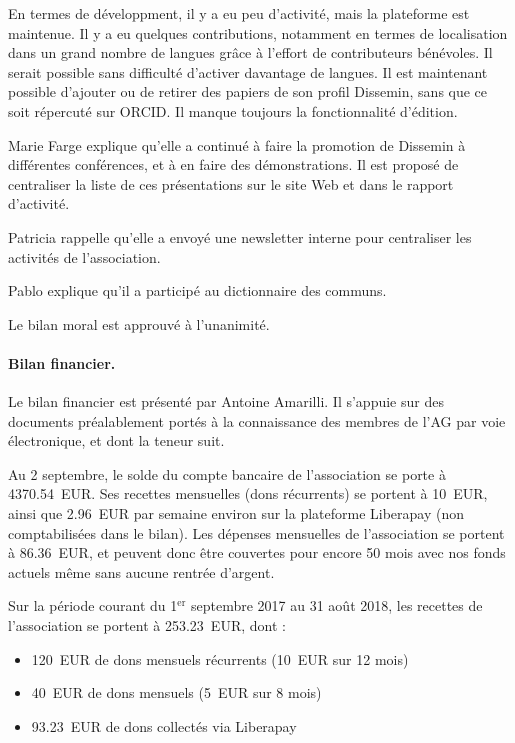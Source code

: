 \documentclass{scrartcl}
\begin{document}
En termes de développment, il y a eu peu d'activité, mais la plateforme est
maintenue. Il y a eu quelques contributions, notamment en termes de
localisation dans un grand nombre de langues grâce à l'effort de contributeurs
bénévoles. Il serait possible sans difficulté d'activer davantage de langues. Il
est maintenant possible d'ajouter ou de retirer des papiers de son profil
Dissemin, sans que ce soit répercuté sur ORCID. Il manque toujours la
fonctionnalité d'édition.

Marie Farge explique qu'elle a continué à faire la promotion de Dissemin à
différentes conférences, et à en faire des démonstrations. Il est proposé de
centraliser la liste de ces présentations sur le site Web et dans le rapport
d'activité.

Patricia rappelle qu'elle a envoyé une newsletter interne pour centraliser les
activités de l'association.

Pablo explique qu'il a participé au dictionnaire des communs.

Le bilan moral est approuvé à l'unanimité.

\paragraph{Bilan financier.} Le bilan financier est présenté par Antoine
Amarilli. Il s'appuie sur des documents préalablement portés à la connaissance des
membres de l'AG par voie électronique, et dont la teneur suit.

Au 2 septembre, le solde du compte bancaire de l'association se porte à
4370.54~EUR. Ses recettes mensuelles (dons récurrents) se portent à 10~EUR,
ainsi que 2.96~EUR par semaine environ sur la plateforme Liberapay (non
comptabilisées dans le bilan). Les dépenses mensuelles de l'association se
portent à 86.36~EUR, et peuvent donc être couvertes pour encore 50 mois avec nos
fonds actuels même sans aucune rentrée d'argent.
 
Sur la période courant du 1$^{\mathrm{er}}$ septembre 2017 au 31 août 2018, les
recettes de l'association se portent à 253.23~EUR, dont :

\begin{itemize}
  \item 120~EUR de dons mensuels récurrents (10~EUR sur 12 mois)
  \item 40~EUR de dons mensuels (5~EUR sur 8 mois)
  \item 93.23~EUR de dons collectés via Liberapay
\end{itemize}
\end{document}
